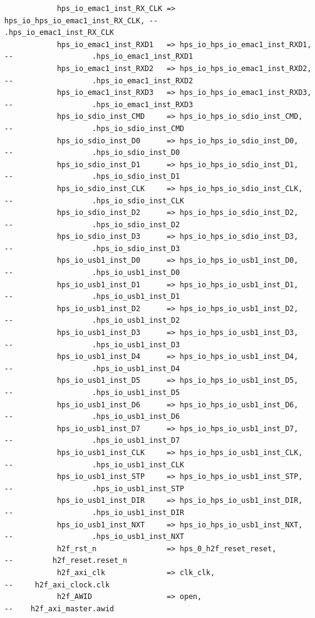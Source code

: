 \documentclass[conference]{IEEEtran}
\begin{document}
\begin{lstlisting}
			hps_io_emac1_inst_RX_CLK => hps_io_hps_io_emac1_inst_RX_CLK, --                  .hps_io_emac1_inst_RX_CLK
			hps_io_emac1_inst_RXD1   => hps_io_hps_io_emac1_inst_RXD1,   --                  .hps_io_emac1_inst_RXD1
			hps_io_emac1_inst_RXD2   => hps_io_hps_io_emac1_inst_RXD2,   --                  .hps_io_emac1_inst_RXD2
			hps_io_emac1_inst_RXD3   => hps_io_hps_io_emac1_inst_RXD3,   --                  .hps_io_emac1_inst_RXD3
			hps_io_sdio_inst_CMD     => hps_io_hps_io_sdio_inst_CMD,     --                  .hps_io_sdio_inst_CMD
			hps_io_sdio_inst_D0      => hps_io_hps_io_sdio_inst_D0,      --                  .hps_io_sdio_inst_D0
			hps_io_sdio_inst_D1      => hps_io_hps_io_sdio_inst_D1,      --                  .hps_io_sdio_inst_D1
			hps_io_sdio_inst_CLK     => hps_io_hps_io_sdio_inst_CLK,     --                  .hps_io_sdio_inst_CLK
			hps_io_sdio_inst_D2      => hps_io_hps_io_sdio_inst_D2,      --                  .hps_io_sdio_inst_D2
			hps_io_sdio_inst_D3      => hps_io_hps_io_sdio_inst_D3,      --                  .hps_io_sdio_inst_D3
			hps_io_usb1_inst_D0      => hps_io_hps_io_usb1_inst_D0,      --                  .hps_io_usb1_inst_D0
			hps_io_usb1_inst_D1      => hps_io_hps_io_usb1_inst_D1,      --                  .hps_io_usb1_inst_D1
			hps_io_usb1_inst_D2      => hps_io_hps_io_usb1_inst_D2,      --                  .hps_io_usb1_inst_D2
			hps_io_usb1_inst_D3      => hps_io_hps_io_usb1_inst_D3,      --                  .hps_io_usb1_inst_D3
			hps_io_usb1_inst_D4      => hps_io_hps_io_usb1_inst_D4,      --                  .hps_io_usb1_inst_D4
			hps_io_usb1_inst_D5      => hps_io_hps_io_usb1_inst_D5,      --                  .hps_io_usb1_inst_D5
			hps_io_usb1_inst_D6      => hps_io_hps_io_usb1_inst_D6,      --                  .hps_io_usb1_inst_D6
			hps_io_usb1_inst_D7      => hps_io_hps_io_usb1_inst_D7,      --                  .hps_io_usb1_inst_D7
			hps_io_usb1_inst_CLK     => hps_io_hps_io_usb1_inst_CLK,     --                  .hps_io_usb1_inst_CLK
			hps_io_usb1_inst_STP     => hps_io_hps_io_usb1_inst_STP,     --                  .hps_io_usb1_inst_STP
			hps_io_usb1_inst_DIR     => hps_io_hps_io_usb1_inst_DIR,     --                  .hps_io_usb1_inst_DIR
			hps_io_usb1_inst_NXT     => hps_io_hps_io_usb1_inst_NXT,     --                  .hps_io_usb1_inst_NXT
			h2f_rst_n                => hps_0_h2f_reset_reset,           --         h2f_reset.reset_n
			h2f_axi_clk              => clk_clk,                         --     h2f_axi_clock.clk
			h2f_AWID                 => open,                            --    h2f_axi_master.awid

\end{lstlisting}
\end{document}
